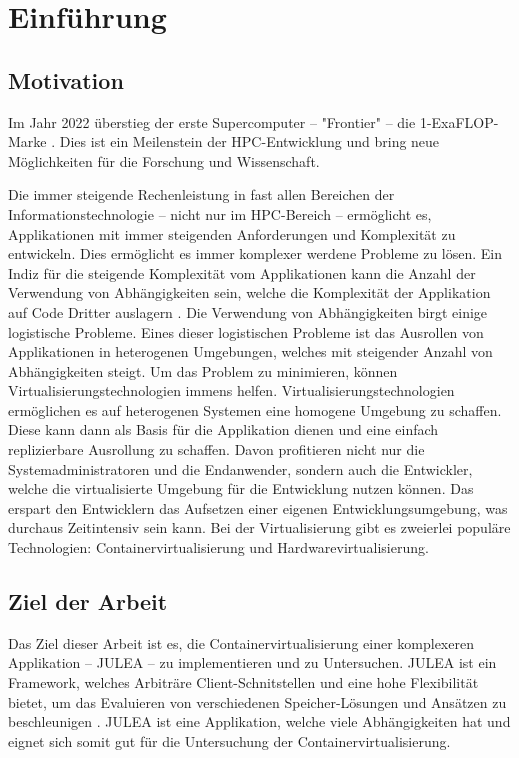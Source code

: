\chapter{Einführung}
\label{cha:introduction}

\section{Motivation}
Im Jahr 2022 überstieg der erste Supercomputer – "Frontier" – die 1-ExaFLOP-Marke \cite[Vgl. 567ff]{rajaramanFrontierWorldsFirst2023}. Dies ist ein Meilenstein der HPC-Entwicklung und bring neue Möglichkeiten für die Forschung und Wissenschaft.

Die immer steigende Rechenleistung in fast allen Bereichen der Informationstechnologie – nicht nur im HPC-Bereich – ermöglicht es, Applikationen mit immer steigenden Anforderungen und Komplexität zu entwickeln. Dies ermöglicht es immer komplexer werdene Probleme zu lösen. Ein Indiz für die steigende Komplexität vom Applikationen kann die Anzahl der Verwendung von Abhängigkeiten sein, welche die Komplexität der Applikation auf Code Dritter auslagern \cite[Vgl. Abbildung 2.4]{2024StateSoftware}. Die Verwendung von Abhängigkeiten birgt einige logistische Probleme. Eines dieser logistischen Probleme ist das Ausrollen von Applikationen in heterogenen Umgebungen, welches mit steigender Anzahl von Abhängigkeiten steigt. Um das Problem zu minimieren, können Virtualisierungstechnologien immens helfen. Virtualisierungstechnologien ermöglichen es auf heterogenen Systemen eine homogene Umgebung zu schaffen. Diese kann dann als Basis für die Applikation dienen und eine einfach replizierbare Ausrollung zu schaffen. Davon profitieren nicht nur die Systemadministratoren und die Endanwender, sondern auch die Entwickler, welche die virtualisierte Umgebung für die Entwicklung nutzen können. Das erspart den Entwicklern das Aufsetzen einer eigenen Entwicklungsumgebung, was durchaus Zeitintensiv sein kann. Bei der Virtualisierung gibt es zweierlei populäre Technologien: Containervirtualisierung und Hardwarevirtualisierung. 

\section{Ziel der Arbeit}

Das Ziel dieser Arbeit ist es, die Containervirtualisierung einer komplexeren Applikation – JULEA – zu implementieren und zu Untersuchen. JULEA \cite{kuhnJULEAFlexibleStorage2017} ist ein Framework, welches Arbiträre Client-Schnitstellen und eine hohe Flexibilität bietet, um das Evaluieren von verschiedenen Speicher-Lösungen und Ansätzen zu beschleunigen \cite[Vgl. 1]{kuhnJULEAFlexibleStorage2017}. JULEA ist eine Applikation, welche viele Abhängigkeiten hat und eignet sich somit gut für die Untersuchung der Containervirtualisierung.

